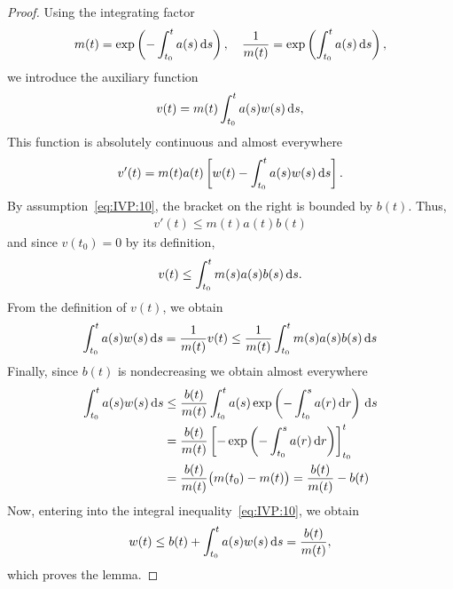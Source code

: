 \begin{proof}
  Using the integrating factor
  \begin{gather*}
    m(t) = \exp\left(-\int_{t_0}^t a(s) \,\mathrm{d} s\right),
    \quad
    \frac1{m(t)} = \exp\left(\int_{t_0}^t a(s) \,\mathrm{d} s\right),
  \end{gather*}
  we introduce the auxiliary function
  \begin{gather*}
    v(t) = m(t) %
    \int_{t_0}^t a(s)w(s)\ds,
  \end{gather*}
  This function is absolutely continuous and almost everywhere
  \begin{gather*}
    v'(t) = m(t) a(t) %
    \left[
      w(t) - \int_{t_0}^t a(s) w(s) \ds
    \right].
  \end{gather*}
  By assumption~\eqref{eq:IVP:10}, the bracket on the right is bounded
  by $b(t)$. Thus,
  \begin{gather*}
    v'(t) \le m(t) a(t) b(t) %
  \end{gather*}
  and since $v(t_0) = 0$ by its definition,
  \begin{gather*}
    v(t) \le \int_{t_0}^t m(s) a(s) b(s) %
    \ds.
  \end{gather*}
  From the definition of $v(t)$, we obtain
  \begin{gather*}
    \int_{t_0}^t a(s)w(s)\ds = \frac1{m(t)} %
    v(t)
    \le \frac1{m(t)} \int_{t_0}^t m(s)a(s)b(s) \ds
  \end{gather*}
  Finally, since $b(t)$ is nondecreasing we obtain almost everywhere
  \begin{align*}
    \int_{t_0}^t a(s)w(s)\,\mathrm{d} s
    &\le  \frac{b(t)}{m(t)} \int_{t_0}^t a(s)
    \exp\left(-\int_{t_0}^s a(r) \,\mathrm{d} r\right)\,\mathrm{d} s
    \\
    &= \frac{b(t)}{m(t)} \left[-
    \exp\left(-\int_{t_0}^s a(r) \,\mathrm{d} r\right)
      \right]_{t_0}^t
    \\
    &= \frac{b(t)}{m(t)} \bigl(m(t_0)-m(t)\bigr)
      = \frac{b(t)}{m(t)} - b(t)
  \end{align*}
  Now, entering into the integral inequality~\eqref{eq:IVP:10}, we
  obtain
  \begin{gather*}
    w(t) \le b(t) + \int_{t_0}^t a(s)w(s)\,\mathrm{d} s = \frac{b(t)}{m(t)},
  \end{gather*}
  which proves the lemma.
\end{proof}

